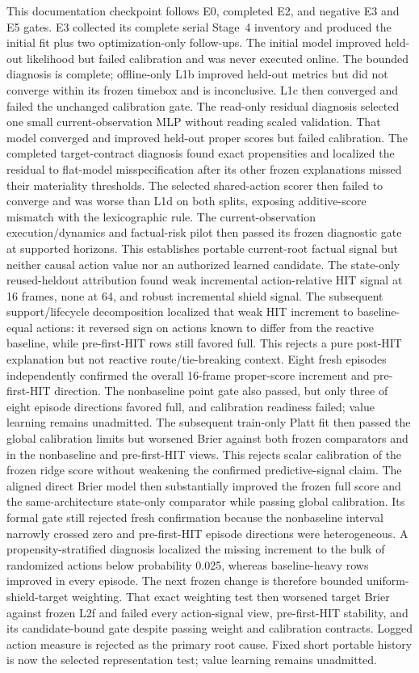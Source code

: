 \documentclass[11pt]{article}
\begin{document}
This documentation checkpoint follows E0, completed E2, and negative E3 and E5
gates.  E3 collected its complete serial Stage~4 inventory and produced the
initial fit plus two optimization-only follow-ups.  The initial model improved
held-out likelihood but failed calibration and was never executed online.  The
bounded diagnosis is complete; offline-only L1b improved held-out metrics but
did not converge within its frozen timebox and is inconclusive.  L1c then
converged and failed the unchanged calibration gate.  The read-only residual
diagnosis selected one small current-observation MLP without reading scaled
validation.  That model converged and improved held-out proper scores but
failed calibration.  The completed target-contract diagnosis found exact
propensities and localized the residual to flat-model misspecification after
its other frozen explanations missed their materiality thresholds.  The
selected shared-action scorer then failed to converge and was worse than L1d
on both splits, exposing additive-score mismatch with the lexicographic rule.
The current-observation execution/dynamics and factual-risk pilot then passed
its frozen diagnostic gate at supported horizons.  This establishes portable
current-root factual signal but neither causal action value nor an authorized
learned candidate.  The state-only reused-heldout attribution found weak
incremental action-relative HIT signal at 16 frames, none at 64, and robust
incremental shield signal.  The subsequent support/lifecycle decomposition
localized that weak HIT increment to baseline-equal actions: it reversed sign
on actions known to differ from the reactive baseline, while pre-first-HIT rows
still favored full.  This rejects a pure post-HIT explanation but not reactive
route/tie-breaking context.  Eight fresh episodes independently confirmed the
overall 16-frame proper-score increment and pre-first-HIT direction.  The
nonbaseline point gate also passed, but only three of eight episode directions
favored full, and calibration readiness failed; value learning remains
unadmitted.  The subsequent train-only Platt fit then passed the global
calibration limits but worsened Brier against both frozen comparators and in
the nonbaseline and pre-first-HIT views.  This rejects scalar calibration of
the frozen ridge score without weakening the confirmed predictive-signal
claim.  The aligned direct Brier model then substantially improved the frozen
full score and the same-architecture state-only comparator while passing global
calibration.  Its formal gate still rejected fresh confirmation because the
nonbaseline interval narrowly crossed zero and pre-first-HIT episode directions
were heterogeneous.  A propensity-stratified diagnosis localized the missing
increment to the bulk of randomized actions below probability 0.025, whereas
baseline-heavy rows improved in every episode.  The next frozen change is
therefore bounded uniform-shield-target weighting.  That exact weighting test
then worsened target Brier against frozen L2f and failed every action-signal
view, pre-first-HIT stability, and its candidate-bound gate despite passing
weight and calibration contracts.  Logged action measure is rejected as the
primary root cause.  Fixed short portable history is now the selected
representation test; value learning remains unadmitted.
\end{document}
